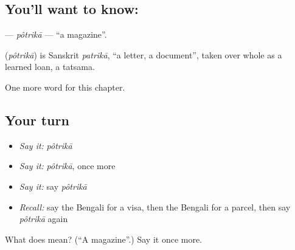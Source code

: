 \subsection*{You'll want to know: }
\textbf{} — \emph{pôtrikā} — \textquotedblleft{}a magazine\textquotedblright{}.

\begin{cousinweb}
\textbf{} (\emph{pôtrikā}) is Sanskrit \emph{patrikā}, \textquotedblleft{}a letter, a document\textquotedblright{}, taken over whole as a learned loan, a tatsama.
\end{cousinweb}

\begin{grammarlens}[title={What you've built}]
One more word for this chapter.
\end{grammarlens}

\subsection*{Your turn}
\begin{itemize}
\raggedright
  \item \emph{Say it:} \emph{pôtrikā}
  \item \emph{Say it:} \emph{pôtrikā}, once more
  \item \emph{Say it:} say \emph{pôtrikā}
  \item \emph{Recall:} say the Bengali for a visa, then the Bengali for a parcel, then say \emph{pôtrikā} again
\end{itemize}

\begin{tcolorbox}[breakable,colback=teal!4,colframe=teal!35!black,title={Before you move on}]
What does  mean? (\textquotedblleft{}A magazine\textquotedblright{}.) Say it once more.
\end{tcolorbox}
